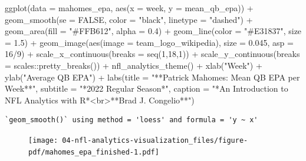 \documentclass[
  letterpaper,
]{krantz}
\newenvironment{Shaded}{\begin{snugshade}}{\end{snugshade}}
\newcommand{\AttributeTok}[1]{\textcolor[rgb]{0.40,0.45,0.13}{#1}}
\newcommand{\ConstantTok}[1]{\textcolor[rgb]{0.56,0.35,0.01}{#1}}
\newcommand{\DecValTok}[1]{\textcolor[rgb]{0.68,0.00,0.00}{#1}}
\newcommand{\FloatTok}[1]{\textcolor[rgb]{0.68,0.00,0.00}{#1}}
\newcommand{\FunctionTok}[1]{\textcolor[rgb]{0.28,0.35,0.67}{#1}}
\newcommand{\NormalTok}[1]{\textcolor[rgb]{0.00,0.23,0.31}{#1}}
\newcommand{\SpecialCharTok}[1]{\textcolor[rgb]{0.37,0.37,0.37}{#1}}
\newcommand{\StringTok}[1]{\textcolor[rgb]{0.13,0.47,0.30}{#1}}
\begin{document}
\begin{Shaded}
\begin{Highlighting}[]
\FunctionTok{ggplot}\NormalTok{(}\AttributeTok{data =}\NormalTok{ mahomes\_epa, }\FunctionTok{aes}\NormalTok{(}\AttributeTok{x =}\NormalTok{ week, }\AttributeTok{y =}\NormalTok{ mean\_qb\_epa)) }\SpecialCharTok{+}
  \FunctionTok{geom\_smooth}\NormalTok{(}\AttributeTok{se =} \ConstantTok{FALSE}\NormalTok{, }\AttributeTok{color =} \StringTok{"black"}\NormalTok{, }\AttributeTok{linetype =} \StringTok{"dashed"}\NormalTok{) }\SpecialCharTok{+}
  \FunctionTok{geom\_area}\NormalTok{(}\AttributeTok{fill =} \StringTok{"\#FFB612"}\NormalTok{, }\AttributeTok{alpha =} \FloatTok{0.4}\NormalTok{) }\SpecialCharTok{+}
  \FunctionTok{geom\_line}\NormalTok{(}\AttributeTok{color =} \StringTok{"\#E31837"}\NormalTok{, }\AttributeTok{size =} \FloatTok{1.5}\NormalTok{) }\SpecialCharTok{+}
  \FunctionTok{geom\_image}\NormalTok{(}\FunctionTok{aes}\NormalTok{(}\AttributeTok{image =}\NormalTok{ team\_logo\_wikipedia), }\AttributeTok{size =} \FloatTok{0.045}\NormalTok{, }\AttributeTok{asp =} \DecValTok{16}\SpecialCharTok{/}\DecValTok{9}\NormalTok{) }\SpecialCharTok{+}
  \FunctionTok{scale\_x\_continuous}\NormalTok{(}\AttributeTok{breaks =} \FunctionTok{seq}\NormalTok{(}\DecValTok{1}\NormalTok{,}\DecValTok{18}\NormalTok{,}\DecValTok{1}\NormalTok{)) }\SpecialCharTok{+}
  \FunctionTok{scale\_y\_continuous}\NormalTok{(}\AttributeTok{breaks =}\NormalTok{ scales}\SpecialCharTok{::}\FunctionTok{pretty\_breaks}\NormalTok{()) }\SpecialCharTok{+}
  \FunctionTok{nfl\_analytics\_theme}\NormalTok{() }\SpecialCharTok{+}
  \FunctionTok{xlab}\NormalTok{(}\StringTok{"Week"}\NormalTok{) }\SpecialCharTok{+}
  \FunctionTok{ylab}\NormalTok{(}\StringTok{"Average QB EPA"}\NormalTok{) }\SpecialCharTok{+}
  \FunctionTok{labs}\NormalTok{(}\AttributeTok{title =} \StringTok{"**Patrick Mahomes: Mean QB EPA per Week**"}\NormalTok{,}
       \AttributeTok{subtitle =} \StringTok{"*2022 Regular Season*"}\NormalTok{,}
       \AttributeTok{caption =} \StringTok{"*An Introduction to NFL Analytics with R*\textless{}br\textgreater{}**Brad J. Congelio**"}\NormalTok{)}
\end{Highlighting}
\end{Shaded}

\begin{verbatim}
`geom_smooth()` using method = 'loess' and formula = 'y ~ x'
\end{verbatim}

\begin{figure}[H]

{\centering \texttt{[image: 04-nfl-analytics-visualization\_files/figure-pdf/mahomes\_epa\_finished-1.pdf]}

}

\end{figure}
\end{document}
